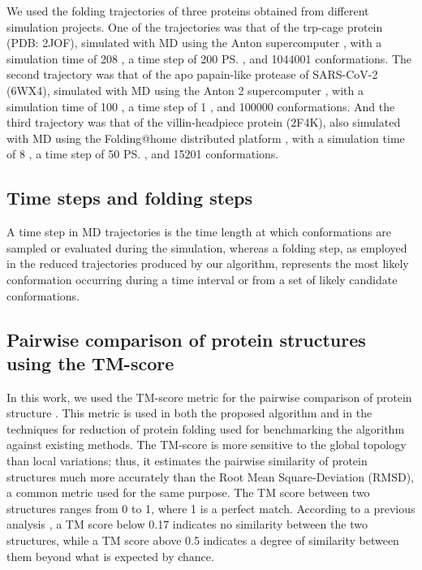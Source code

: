 \documentclass[twocolumn]{bmcart}%
\begin{document}
We used the folding trajectories of three proteins obtained from different simulation projects. One of the trajectories was that of the trp-cage protein (PDB: 2JOF), simulated with MD using the Anton supercomputer \cite{Shaw2011}, with a simulation time of 208 \us, a time step of 200 \ps, and 1044001 conformations. The second trajectory was that of the apo papain-like protease of SARS-CoV-2 (6WX4), simulated with MD using the Anton 2 supercomputer \cite{Shaw2020}, with a simulation time of 100 \us, a time step of 1 \ns, and 100000 conformations. And the third trajectory was that of the villin-headpiece protein (2F4K), also simulated with MD using the Folding@home distributed platform \cite{PandeEnsign07}, with a simulation time of 8 \us, a time step of 50 \ps, and 15201 conformations.

\subsection*{Time steps and folding steps}

A time step in MD trajectories is the time length at which conformations are sampled or evaluated during the simulation, whereas a folding step, as employed in the reduced trajectories produced by our algorithm, represents the most likely conformation occurring during a time interval or from a set of likely candidate conformations.

\subsection*{Pairwise comparison of protein structures using the TM-score \label{sec:Comparing-Structures}}

In this work, we used the TM-score metric for the pairwise comparison of protein structure \cite{Zhang2004}. This metric is used in both the proposed algorithm and in the techniques for reduction of protein folding used for benchmarking the algorithm against existing methods. The TM-score is more sensitive to the global topology than local variations; thus, it estimates the pairwise similarity of protein structures much more accurately than the Root Mean Square-Deviation (RMSD), a common metric used for the same purpose. The TM score between two structures ranges from 0 to 1, where 1 is a perfect match. According to a previous analysis \cite{zhang2010}, a TM score below 0.17 indicates no similarity between the two structures, while a TM score above 0.5 indicates a degree of similarity between them beyond what is expected by chance.
\end{document}

